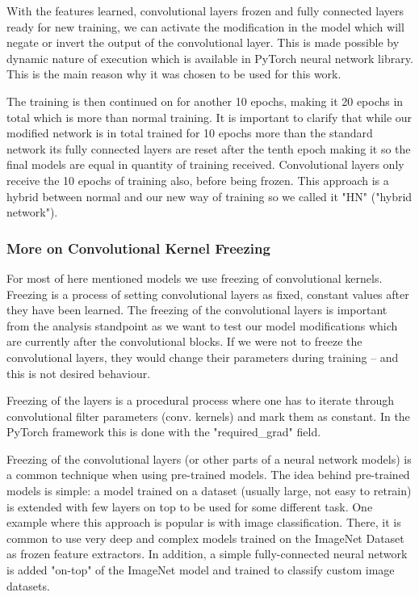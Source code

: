 \documentclass[b5paper]{book}
\begin{document}
With the features learned, convolutional layers frozen and fully connected layers ready for new training, we can activate the modification in the model which will negate or invert the output of the convolutional layer. This is made possible by dynamic nature of execution which is available in PyTorch neural network library. This is the main reason why it was chosen to be used for this work. 

The training is then continued on for another 10 epochs, making it 20 epochs in total which is more than normal training. It is important to clarify that while our modified network is in total trained for 10 epochs more than the standard network its fully connected layers are reset after the tenth epoch making it so the final models are equal in quantity of training received. Convolutional layers only receive the 10 epochs of training also, before being frozen. This approach is a hybrid between normal and our new way of training so we called it "HN" ("hybrid network").

\subsubsection{More on Convolutional Kernel Freezing}

For most of here mentioned models we use freezing of convolutional kernels. Freezing is a process of setting convolutional layers as fixed, constant values after they have been learned. The freezing of the convolutional layers is important from the analysis standpoint as we want to test our model modifications which are currently after the convolutional blocks. If we were not to freeze the convolutional layers, they would change their parameters during training -- and this is not desired behaviour. 

Freezing of the layers is a procedural process where one has to iterate through convolutional filter parameters (conv. kernels) and mark them as constant. In the PyTorch framework this is done with the "required\_grad" field.

Freezing of the convolutional layers (or other parts of a neural network models) is a common technique when using pre-trained models. The idea behind pre-trained models is simple: a model trained on a dataset (usually large, not easy to retrain) is extended with few layers on top to be used for some different task. One example where this approach is popular is with image classification. There, it is common to use very deep and complex models trained on the ImageNet Dataset as frozen feature extractors. In addition, a simple fully-connected neural network is added "on-top" of the ImageNet model and trained to classify custom image datasets.
\end{document}
